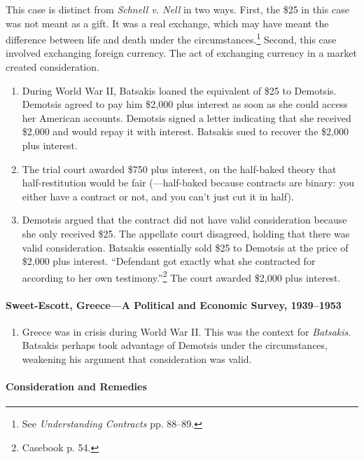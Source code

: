 This case is distinct from \emph{Schnell v. Nell} in two ways. First, the \$25 
in this case was not meant as a gift. It was a real exchange, which may have 
meant the difference between life and death under the 
circumstances.\footnote{See \emph{Understanding Contracts} pp. 88--89.} 
Second, this case involved exchanging foreign currency. The act of exchanging 
currency in a market created consideration.

\begin{enumerate}
    \item During World War II, Batsakis loaned the equivalent of \$25 to 
    Demotsis. Demotsis agreed to pay him \$2,000 plus interest as soon as she 
    could access her American accounts. Demotsis signed a letter indicating 
    that she received \$2,000 and would repay it with interest. Batsakis sued 
    to recover the \$2,000 plus interest.
    \item The trial court awarded \$750 plus interest, on the half-baked 
    theory that half-restitution would be fair (---half-baked because 
    contracts are binary: you either have a contract or not, and you can't 
    just cut it in half).
    \item Demotsis argued that the contract did not have valid consideration 
    because she only received \$25. 
    The appellate court disagreed, holding that there was valid consideration. 
    Batsakis essentially sold \$25 to Demotsis at the price of \$2,000 plus 
    interest. ``Defendant got exactly what she contracted for according to her 
    own testimony.''\footnote{Casebook p. 54.} The court awarded \$2,000 plus 
    interest.
\end{enumerate}

\paragraph{Sweet-Escott, Greece---A Political and Economic Survey, 
1939--1953}

\begin{enumerate}
    \item Greece was in crisis during World War II. This was the context for 
    \emph{Batsakis}. Batsakis perhaps took advantage of Demotsis under the 
    circumstances, weakening his argument that consideration was valid.
\end{enumerate}

\paragraph{Consideration and Remedies}

